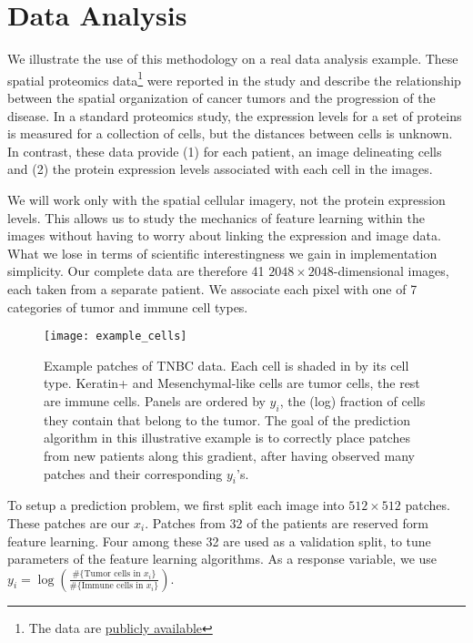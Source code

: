 
\section{Data Analysis}

We illustrate the use of this methodology on a real data analysis example. These
spatial proteomics data\footnote{The data are
  \href{https://www.angelolab.com/mibi-data}{publicly available}} were reported
in the study \citep{keren2018structured} and describe the relationship between
the spatial organization of cancer tumors and the progression of the disease. In
a standard proteomics study, the expression levels for a set of proteins is
measured for a collection of cells, but the distances between cells is unknown.
In contrast, these data provide (1) for each patient, an image delineating cells
and (2) the protein expression levels associated with each cell in the images.

We will work only with the spatial cellular imagery, not the protein expression
levels. This allows us to study the mechanics of feature learning within the
images without having to worry about linking the expression and image data. What
we lose in terms of scientific interestingness we gain in implementation
simplicity. Our complete data are therefore 41 $2048 \times 2048$-dimensional
images, each taken from a separate patient. We associate each pixel with one of
7 categories of tumor and immune cell types.

\begin{figure}
  \centering
  \texttt{[image: example\_cells]}
  \caption{Example patches of TNBC data. Each cell is shaded in by its cell
    type. Keratin+ and Mesenchymal-like cells are tumor cells, the rest are
    immune cells. Panels are ordered by $y_i$, the (log) fraction of cells they
    contain that belong to the tumor. The goal of the prediction algorithm in
    this illustrative example is to correctly place patches from new patients
    along this gradient, after having observed many patches and their
    corresponding $y_i$'s.}
  \label{fig:example_cells}
\end{figure}


To setup a prediction problem, we first split each image into $512 \times 512$
patches. These patches are our $x_{i}$. Patches from 32 of the patients are
reserved form feature learning. Four among these 32 are used as a validation
split, to tune parameters of the feature learning algorithms. As a response
variable, we use $y_{i} = \log\left(\frac{\#\{\text{Tumor cells in }x_{i}\}}{\#\{\text{Immune cells in }x_i\}}\right)$.

